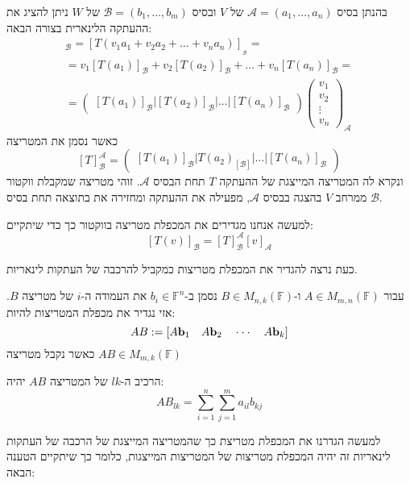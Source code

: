\documentclass{tstextbook}
\begin{document}
\begin{definition}
בהנתן בסיס \(\mathcal{A}=\left( a_{1},\dots,a_{n} \right)\) של \(V\) ובסיס \(\mathcal{ B}=\left( b_{1},\dots,b_{m} \right)\) של \(W\) ניתן להציג את ההעתקה הלינארית בצורה הבאה:
\begin{gather*}[T(v)]_{\mathcal{B} }=\left[ T\left( v_{1}a_{1}+v_{2}a_{2}+\dots+v_{n}a_{n} \right) \right]_{\mathcal{_{B}} }= \\=v_{1}[T(a_{1})]_{\mathcal{B} }+v_{2}[T(a_{2})]_{\mathcal{B} }+\dots+v_{n}[T(a_{n})]_{\mathcal{B} }= \\=\begin{pmatrix}[T(a_{1})]_{\mathcal{B} }\bigg| [T(a_{2})]_{\mathcal{B} }\bigg| \dots \bigg| [T(a_{n})]_{\mathcal{B} }\end{pmatrix}\begin{pmatrix}v_{1}\\v_{2}\\\vdots\\v_{n}\end{pmatrix}_{\mathcal{A} } 
\end{gather*}
כאשר נסמן את המטריצה 
$$[T]_{\mathcal{B}}^{\mathcal{A}}=\begin{pmatrix}[T(a_{1})]_{\mathcal{B}}\bigg| T(a_{2})_\left[ \mathcal{B} \right]\bigg| \dots \bigg| [T(a_{n})]_{\mathcal{B}}\end{pmatrix}$$
ונקרא לה המטריצה המייצגת של ההעתקה \(T\) תחת הבסיס \(\mathcal{ A}\). זוהי מטריצה שמקבלת ווקטור ממרחב \(V\) בהצגה בבסיס \(\mathcal{A}\), מפעילה את ההעתקה ומחזירה את בתוצאה תחת בסיס \(\mathcal{B}\).

\end{definition}
\begin{remark}
למעשה אנחנו מגדירים את המכפלת מטריצה בווקטור כך כדי שיתקיים:
$$[T(v)]_{\mathcal{B} }=[T]_{\mathcal{B} }^{\mathcal{A} }[v]_{\mathcal{A} }$$

\end{remark}
כעת נרצה להגדיר את המכפלת מטריצות כמקביל להרכבה של העתקות לינאריות.

\begin{definition}
עבור \(A \in M_{m,n}\left( \mathbb{F}  \right)\) ו-\(B \in M_{n,k}\left( \mathbb{F}  \right)\) נסמן ב-\(b_{i}\in \mathbb{F} ^{n}\) את העמודה ה-\(i\) של מטריצה \(B\). אזי נגדיר את מכפלת המטריצות להיות:
$$A B:=\left[A{\bf b}_{1}\quad A{\bf b}_{2}\quad\cdot\cdot\cdot\quad A{\bf b}_{k}\right]$$
כאשר נקבל מטריצה \(AB \in M_{m,k}\left( \mathbb{F}  \right)\)

\end{definition}
\begin{corollary}
הרכיב ה-\(lk\) של המטריצה \(AB\) יהיה:
$$AB_{lk}=\sum_{i=1}^{n}\sum_{j=1}^{m} a_{il}b_{kj}$$

\end{corollary}
למעשה הגדרנו את המכפלת מטריצת כך שהמטריצה המייצגת של הרכבה של העתקות לינאריות זה יהיה המכפלת מטריצות של המטריצות המייצגות, כלומר כך שיתקיים הטענה הבאה:
\end{document}
